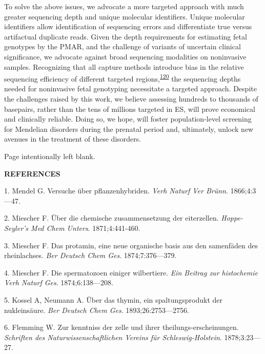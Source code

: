 \documentclass[11pt,letterpaper]{book}
\makeatletter
\newcommand*{\blankpage}{%
\vspace*{\fill}
{\centering Page intentionally left blank. \par}
\vspace{\fill}}
\renewcommand*{\cleardoublepage}{\clearpage\if@twoside \ifodd\c@page\else
\blankpage
\thispagestyle{empty}
\newpage
\if@twocolumn\hbox{}\newpage\fi\fi\fi}
\newcommand{\myonein}[1]{
\begin{center}
\bfseries\Large\MakeUppercase{#1}
\end{center}
}
\makeatother
\begin{document}
To solve the above issues, we advocate a more targeted approach with much greater sequencing depth and unique molecular identifiers.
Unique molecular identifiers allow identification of sequencing errors and differentiate true versus artifactual duplicate reads.
Given the depth requirements for estimating fetal genotypes by the PMAR, and the challenge of variants of uncertain clinical significance, we advocate against broad sequencing modalities on noninvasive samples.
Recognizing that all capture methods introduce bias in the relative sequencing efficiency of different targeted regions,\textsuperscript{\protect\hyperlink{ref-seaby:2016aa}{120}} the sequencing depths needed for noninvasive fetal genotyping necessitate a targeted approach.
Despite the challenges raised by this work, we believe assessing hundreds to thousands of basepairs, rather than the tens of millions targeted in ES, will prove economical and clinically reliable.
Doing so, we hope, will foster population-level screening for Mendelian disorders during the prenatal period and, ultimately, unlock new avenues in the treatment of these disorders.

\backmatter

\setlength{\parindent}{0ex}
\cleardoublepage
{}
{}
\myonein{REFERENCES}

\hypertarget{refs}{}
\leavevmode\hypertarget{ref-mendel:1866aa}{}%
1. Mendel G. Versuche über pflanzenhybriden. \emph{Verh Naturf Ver Brünn}. 1866;4:3---47.

\leavevmode\hypertarget{ref-miescher:1871aa}{}%
2. Miescher F. Über die chemische zusammensetzung der eiterzellen. \emph{Hoppe-Seyler's Med Chem Unters}. 1871;4:441-460.

\leavevmode\hypertarget{ref-miescher:1874aa}{}%
3. Miescher F. Das protamin, eine neue organische basis aus den samenfäden des rheinlachses. \emph{Ber Deutsch Chem Ges}. 1874;7:376---379.

\leavevmode\hypertarget{ref-miescher:1874ab}{}%
4. Miescher F. Die spermatozoen einiger wilbertiere. \emph{Ein Beitrag zur histochemie Verh Naturf Ges}. 1874;6:138---208.

\leavevmode\hypertarget{ref-kossel:1893aa}{}%
5. Kossel A, Neumann A. Über das thymin, ein spaltungsprodukt der nukleinsäure. \emph{Ber Deutsch Chem Ges}. 1893;26:2753---2756.

\leavevmode\hypertarget{ref-flemming:1878aa}{}%
6. Flemming W. Zur kenntniss der zelle und ihrer theilungs-erscheinungen. \emph{Schriften des Naturwissenschaftlichen Vereins für Schleswig-Holstein}. 1878;3:23---27.
\end{document}
